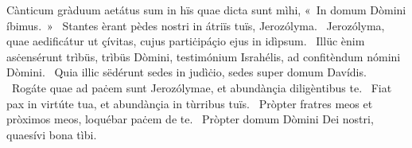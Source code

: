 { Cànticum gràduum}
{%
aetátus sum in hïs quae dicta sunt mìhi, «~In domum Dòmini íbimus.~»
~Stantes èrant pèdes nostri in átriïs tuïs, Jerozólyma. 
~Jerozólyma, quae aedificátur ut çívitas, cujus partiċipáçio ejus in idìpsum. 
~Illüc ènim asċensérunt trìbüs, trìbüs Dòmini, testimónium Israhélis, ad confitèndum nómini Dòmini. 
~Quia illic sëdérunt sedes in judìċio, sedes super domum Davídis. 
~Rogáte quae ad paċem sunt Jerozólymae, et abundànçia diligèntibus te. 
~Fiat pax in virtúte tua, et abundànçia in tùrribus tuïs. 
~Pròpter fratres meos et pròximos meos, loquébar paċem de te. 
~Pròpter domum Dòmini Dei nostri, quaesívi bona tìbi. 
}
